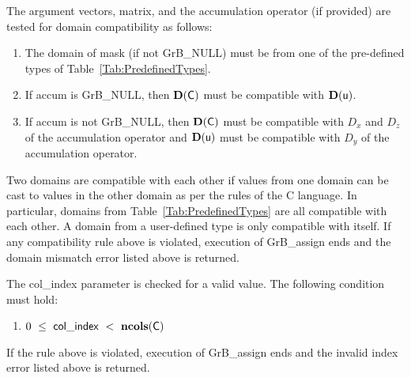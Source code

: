The argument vectors, matrix, and the accumulation 
operator (if provided) are tested for domain compatibility as follows:
\begin{enumerate}
	\item The domain of {\sf mask} (if not {\sf GrB\_NULL}) must be from one of 
    the pre-defined types of Table~\ref{Tab:PredefinedTypes}.

	\item If {\sf accum} is {\sf GrB\_NULL}, then $\bold{D}({\sf C})$ must be 
    compatible with $\bold{D}({\sf u})$.

	\item If {\sf accum} is not {\sf GrB\_NULL}, then $\bold{D}({\sf C})$ must be
    compatible with $D_x$ and $D_z$ of the accumulation operator and 
    $\bold{D}({\sf u})$ must be compatible with $D_y$ of the accumulation operator.
\end{enumerate}
Two domains are compatible with each other if values from one domain can be cast 
to values in the other domain as per the rules of the C language.
In particular, domains from Table~\ref{Tab:PredefinedTypes} are all compatible 
with each other. A domain from a user-defined type is only compatible with itself.
If any compatibility rule above is violated, execution of {\sf GrB\_assign} ends
and the domain mismatch error listed above is returned.

The {\sf col\_index} parameter is checked for a valid value.  The following
condition must hold:
\begin{enumerate}
	\item $0\ \leq\ {\sf col\_index} \ <\ \bold{ncols}({\sf C})$
\end{enumerate}
If the rule above is violated, execution of {\sf GrB\_assign} ends 
and the invalid index error listed above is returned.

